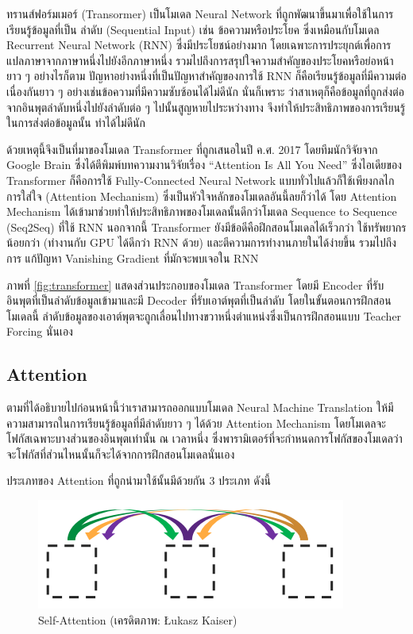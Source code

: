 ทรานส์ฟอร์มเมอร์ (Transormer)\autocite{vaswani2017a} เป็นโมเดล Neural Network ที่ถูกพัฒนาขึ้นมาเพื่อใช้ในการเรียนรู้ข้อมูลที่เป็น%
ลำดับ (Sequential Input) เช่น ข้อความหรือประโยค ซึ่งเหมือนกับโมเดล Recurrent Neural Network (RNN) ซึ่งมีประโยชน์อย่างมาก%
โดยเฉพาะการประยุกต์เพื่อการแปลภาษาจากภาษาหนึ่งไปยังอีกภาษาหนึ่ง รวมไปถึงการสรุปใจความสำคัญของประโยคหรือย่อหน้ายาว ๆ อย่างไรก็ตาม 
ปัญหาอย่างหนึ่งที่เป็นปัญหาสำคัญของการใช้ RNN ก็คือเรียนรู้ข้อมูลที่มีความต่อเนื่องกันยาว ๆ อย่างเช่นข้อความที่มีความซับซ้อนได้ไม่ดีนัก นั่นก็เพราะ%
ว่าสาเหตุก็คือข้อมูลที่ถูกส่งต่อจากอินพุตลำดับหนึ่งไปยังลำดับต่อ ๆ ไปนั้นสูญหายไประหว่างทาง จึงทำให้ประสิทธิภาพของการเรียนรู้ในการส่งต่อข้อมูลนั้น%
ทำได้ไม่ดีนัก

ด้วยเหตุนี้จึงเป็นที่มาของโมเดล Transformer ที่ถูกเสนอในปี ค.ศ. 2017 โดยทีมนักวิจัยจาก Google Brain ซึ่งได้ตีพิมพ์บทความงานวิจัยเรื่อง 
\enquote{Attention Is All You Need}\autocite{vaswani2017a} ซึ่งไอเดียของ Transformer ก็คือการใช้ Fully-Connected 
Neural Network แบบทั่วไปแล้วก็ใช้เพียงกลไกการใส่ใจ (Attention Mechanism) ซึ่งเป็นหัวใจหลักของโมเดลอันนี้ลยก็ว่าได้ โดย Attention 
Mechanism ได้เข้ามาช่วยทำให้ประสิทธิภาพของโมเดลนั้นดีกว่าโมเดล Sequence to Sequence (Seq2Seq) ที่ใช้ RNN นอกจากนี้ Transformer 
ยังมีข้อดีคือฝึกสอนโมเดลได้เร็วกว่า ใช้ทรัพยากรน้อยกว่า (ทำงานกับ GPU ได้ดีกว่า RNN ด้วย) และตีความการทำงานภายในได้ง่ายขึ้น รวมไปถึงการ%
แก้ปัญหา Vanishing Gradient ที่มักจะพบเจอใน RNN 

ภาพที่ \ref{fig:transformer} แสดงส่วนประกอบของโมเดล Transformer โดยมี Encoder ที่รับอินพุตที่เป็นลำดับข้อมูลเข้ามาและมี Decoder 
ที่รับเอาต์พุตที่เป็นลำดับ โดยในขั้นตอนการฝึกสอนโมเดลนี้ ลำดับข้อมูลของเอาต์พุตจะถูกเลื่อนไปทางขวาหนึ่งตำแหน่งซึ่งเป็นการฝึกสอนแบบ Teacher 
Forcing นั่นเอง

\subsection{Attention}
\label{ssec:attention}

ตามที่ได้อธิบายไปก่อนหน้านี้ว่าเราสามารถออกแบบโมเดล Neural Machine Translation ให้มีความสามารถในการเรียนรู้ข้อมูลที่มีลำดับยาว ๆ 
ได้ด้วย Attention Mechanism โดยโมเดลจะโฟกัสเฉพาะบางส่วนของอินพุตเท่านั้น ณ เวลาหนึ่ง ซึ่งพารามิเตอร์ที่จะกำหนดการโฟกัสของโมเดลว่า%
จะโฟกัสที่ส่วนไหนนั้นก็จะได้จากการฝึกสอนโมเดลนั่นเอง

ประเภทของ Attention ที่ถูกนำมาใช้นั้นมีด้วยกัน 3 ประเภท ดังนี้

\begin{figure}[htbp]
    \centering
    \includegraphics[width=0.6\linewidth]{fig/attention_1_self.png}
    \caption{Self-Attention (เครดิตภาพ: Łukasz Kaiser)}
    \label{fig:self_attention}
\end{figure}

